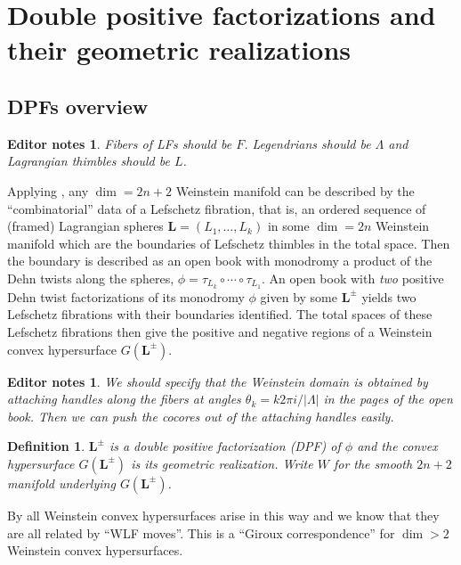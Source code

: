 \documentclass[11pt]{amsart}
\newcommand{\thicc}[1]{\pmb{#1}}
\newcommand{\Leg}{\Lambda}
\newcommand{\LagTuple}{\thicc{L}}
\newcommand{\Lag}{L}
\newtheorem{defn}[thm]{Definition}
\newtheorem{edits}[thm]{Editor notes}
\begin{document}
\section{Double positive factorizations and their geometric realizations}

\subsection{DPFs overview}

\begin{edits}
Fibers of LFs should be $F$. Legendrians should be $\Leg$ and Lagrangian thimbles should be $\Lag$.
\end{edits}

Applying \cite{BHH:GirouxCorrespondence, GirouxPardon}, any $\dim = 2n+2$ Weinstein manifold can be described by the ``combinatorial'' data of a Lefschetz fibration, that is, an ordered sequence of (framed) Lagrangian spheres $\LagTuple = (L_{1}, \dots, L_{k})$ in some $\dim=2n$ Weinstein manifold which are the boundaries of Lefschetz thimbles in the total space. Then the boundary is described as an open book with monodromy a product of the Dehn twists along the spheres, $\phi = \tau_{L_{k}}\circ \cdots \circ \tau_{L_{1}}$. An open book with \emph{two} positive Dehn twist factorizations of its monodromy $\phi$ given by some $\LagTuple^{\pm}$ yields two Lefschetz fibrations with their boundaries identified. The total spaces of these Lefschetz fibrations then give the positive and negative regions of a Weinstein convex hypersurface $G(\LagTuple^{\pm})$. 

\begin{edits}
We should specify that the Weinstein domain is obtained by attaching handles along the fibers at angles $\theta_{k} = k2\pi i/|\Leg|$ in the pages of the open book. Then we can push the cocores out of the attaching handles easily.
\end{edits}

\begin{defn}
$\LagTuple^{\pm}$ is a \emph{double positive factorization} (DPF) of $\phi$ and the convex hypersurface $G(\LagTuple^{\pm})$ is its \emph{geometric realization}. Write $W$ for the smooth $2n+2$ manifold underlying $G(\LagTuple^{\pm})$.
\end{defn}

By \cite{BHH:GirouxCorrespondence} all Weinstein convex hypersurfaces arise in this way and we know that they are all related by ``WLF moves''. This is a ``Giroux correspondence'' for $\dim > 2$ Weinstein convex hypersurfaces.
\end{document}
